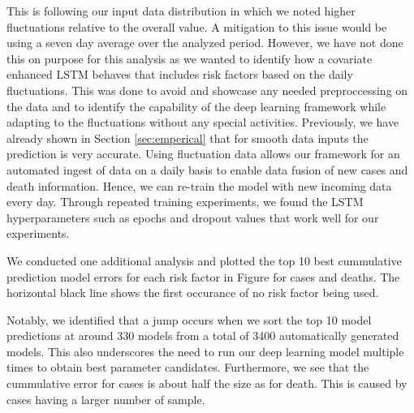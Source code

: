 \documentclass[letterpaper, inpress]{jds} %
\renewcommand{\_}{%
    \textunderscore\hspace{0pt}%
}
\begin{document}
This is following our input data distribution in which we noted higher
fluctuations relative to the overall value. A mitigation to this issue
would be using a seven day average over the analyzed period. However,
we have not done this on purpose for this analysis as we wanted to
identify how a covariate enhanced LSTM behaves that includes risk
factors based on the daily fluctuations. This was done to avoid and
showcase any needed preproccessing on the data and to identify the
capability of the deep learning framework while adapting to the
fluctuations without any special activities. Previously, we have
already shown in Section \ref{sec:emperical} that for smooth data
inputs the prediction is very accurate.  Using fluctuation data allows
our framework for an automated ingest of data on a daily basis to
enable data fusion of new cases and death information. Hence, we can
re-train the model with new incoming data every day. Through repeated
training experiments, we found the LSTM hyperparameters such as epochs
and dropout values that work well for our experiments.

We conducted one additional analysis and plotted the top 10 best
cummulative prediction model errors for each risk factor in
Figure \label{fig:place-top10} for cases and deaths.  The horizontal
black line shows the first occurance of no risk factor being used.

Notably, we identified that a jump occurs when we sort the top 10
model predictions at around 330 models from a total of 3400
automatically generated models. This also underscores the need to run
our deep learning model multiple times to obtain best parameter
candidates.  Furthermore, we see that the cummulative error for cases
is about half the size as for death. This is caused by cases having a
larger number of sample.

\end{document}
